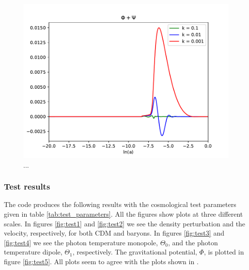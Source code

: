 \documentclass{aa}
\begin{document}
\begin{figure}[h!]
   \includegraphics[scale=0.5]{Figures/M3_phipsi.pdf}
   \caption{...}\label{fig:M3_phipsi}
\end{figure}





\subsubsection{Test results}
The code produces the following results with the cosmological test parameters given in table \ref{tab:test_parameters}. All the figures show plots at three different scales.
In figures \ref{fig:test1} and \ref{fig:test2} we see the density perturbation and the velocity, respectively, for both CDM and baryons. In figures \ref{fig:test3}
and \ref{fig:test4} we see the photon temperature monopole, $\Theta_0$, and the photon temperature dipole, $\Theta_1$, respectively. The gravitational potential, $\Phi$, is plotted
in figure \ref{fig:test5}. All plots seem to agree with the plots shown in \cite{winther:2023}.   
\end{document}
